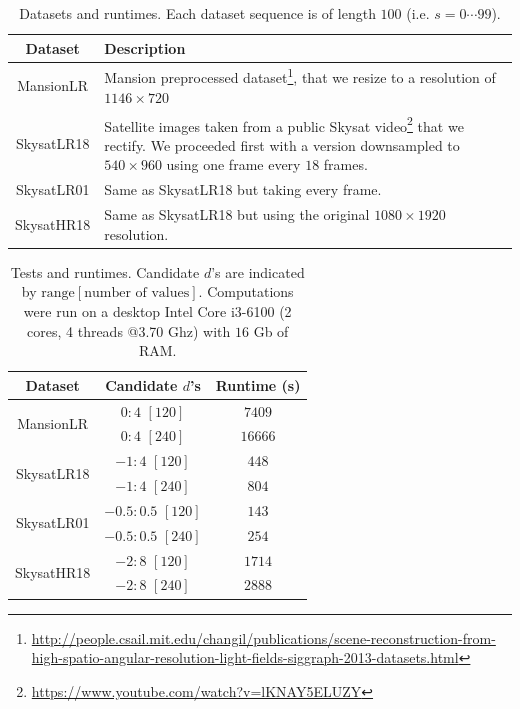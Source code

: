 \documentclass{article}
\theoremstyle{definition}
\begin{document}
\begin{savenotes}
\begin{table}[ht]
 \centering
 \begin{tabular}{|c|p{10cm}|}
  \hline
  \textbf{Dataset} & \textbf{Description} \\
  \hline \hline 
  MansionLR &Mansion preprocessed dataset\footnote{\url{http://people.csail.mit.edu/changil/publications/scene-reconstruction-from-high-spatio-angular-resolution-light-fields-siggraph-2013-datasets.html}}, that we resize to a resolution of $1146\times 720$\\
  \hline 
  SkysatLR18 & Satellite images taken from a public Skysat video\footnote{\url{https://www.youtube.com/watch?v=lKNAY5ELUZY}} that we rectify. We proceeded first with a version downsampled to $540\times 960$ using one frame every $18$ frames.\\
  \hline 
  SkysatLR01 & Same as SkysatLR18 but taking every frame.\\
  \hline 
  SkysatHR18 & Same as SkysatLR18 but using the original $1080\times 1920$ resolution.\\
  \hline
 \end{tabular}
 \caption{Datasets and runtimes. Each dataset sequence is of length $100$ (i.e. $s=0\cdots 99$). }
 \label{table:datasets}
\end{table}
\end{savenotes}


\begin{table}[ht]
\centering
  \begin{tabular}{|c|c|c|}
   \hline
  \textbf{Dataset} & \textbf{Candidate $d$'s} & \textbf{Runtime (s)}\\
  \hline \hline 
  \multirow{2}{*}{MansionLR} & $0:4$ $[120]$ & $7409$\\
  & $0:4$ $[240]$ & $16666$\\
  \hline 
  \multirow{2}{*}{SkysatLR18} & $-1:4$ $[120]$ & $448$\\
  & $-1:4$ $[240]$ & $804$\\
  \hline 
  \multirow{2}{*}{SkysatLR01} & $-0.5:0.5$ $[120]$ & $143$\\
  & $-0.5:0.5$ $[240]$ & $254$\\
  \hline 
  \multirow{2}{*}{SkysatHR18} & $-2:8$ $[120]$ & $1714$\\
  & $-2:8$ $[240]$ & $2888$\\
  \hline
  \end{tabular}

 \caption{Tests and runtimes. Candidate $d$'s are indicated by $\mathrm{range}[\text{number of values}]$. Computations were run on a desktop Intel Core i3-6100 (2 cores, 4 threads @3.70 Ghz) with $16$ Gb of RAM.}
 \label{table:tests}
\end{table}
\end{document}
